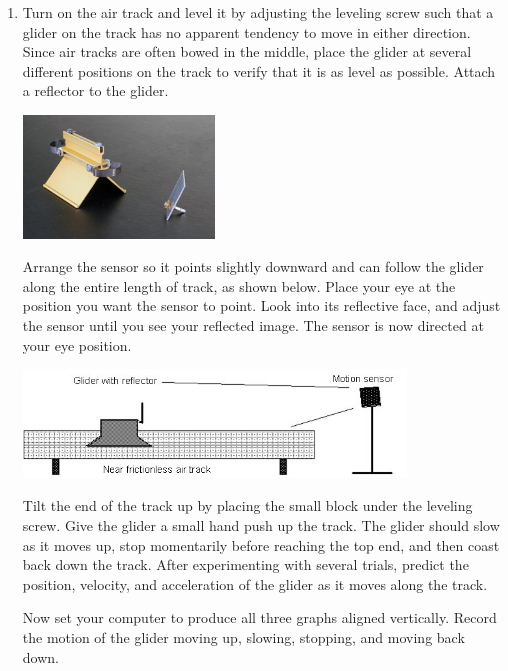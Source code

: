 \begin{enumerate}[start=6]

\item Turn on the air track and level it by adjusting the leveling screw such that a glider on the track has no apparent tendency to move in either direction.  Since air tracks are often bowed in the middle, place the glider at several different positions on the track to verify that it is as level as possible.  Attach a reflector to the glider.
\begin{center} \includegraphics*[width=0.4\textwidth]{imgs/6labs/6Alab/6Aexp2/6A-EXP2_gilder.jpg} \end{center}

Arrange the sensor so it points slightly downward and can follow the glider along the entire length of track, as shown below.  Place your eye at the position you want the sensor to point.  Look into its reflective face, and adjust the sensor until you see your reflected image.  The sensor is now directed at your eye position.
\begin{center} \includegraphics*[width=0.8\textwidth]{imgs/6labs/6Alab/6Aexp2/exp2_fig5fx_2.jpg} \end{center}

Tilt the end of the track up by placing the small block under the leveling screw.  Give the glider a small hand push up the track.  The glider should slow as it moves up, stop momentarily before reaching the top end, and then coast back down the track.  After experimenting with several trials, predict the position, velocity, and acceleration of the glider as it moves along the track.

Now set your computer to produce all three graphs aligned vertically.  Record the motion of the glider moving up, slowing, stopping, and moving back down.


\end{enumerate}
